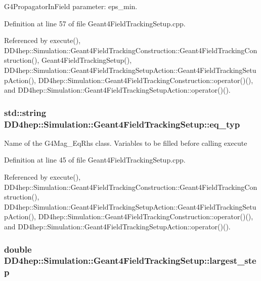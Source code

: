 G4PropagatorInField parameter: eps\_\-min. 

Definition at line 57 of file Geant4FieldTrackingSetup.cpp.

Referenced by execute(), DD4hep::Simulation::Geant4FieldTrackingConstruction::Geant4FieldTrackingConstruction(), Geant4FieldTrackingSetup(), DD4hep::Simulation::Geant4FieldTrackingSetupAction::Geant4FieldTrackingSetupAction(), DD4hep::Simulation::Geant4FieldTrackingConstruction::operator()(), and DD4hep::Simulation::Geant4FieldTrackingSetupAction::operator()().\hypertarget{struct_d_d4hep_1_1_simulation_1_1_geant4_field_tracking_setup_aade0e19505a1c090a549c923b079ca56}{
\subsubsection[{eq\_\-typ}]{\setlength{\rightskip}{0pt plus 5cm}std::string {\bf DD4hep::Simulation::Geant4FieldTrackingSetup::eq\_\-typ}}}
\label{struct_d_d4hep_1_1_simulation_1_1_geant4_field_tracking_setup_aade0e19505a1c090a549c923b079ca56}


Name of the G4Mag\_\-EqRhs class. Variables to be filled before calling execute 

Definition at line 45 of file Geant4FieldTrackingSetup.cpp.

Referenced by execute(), DD4hep::Simulation::Geant4FieldTrackingConstruction::Geant4FieldTrackingConstruction(), DD4hep::Simulation::Geant4FieldTrackingSetupAction::Geant4FieldTrackingSetupAction(), DD4hep::Simulation::Geant4FieldTrackingConstruction::operator()(), and DD4hep::Simulation::Geant4FieldTrackingSetupAction::operator()().\hypertarget{struct_d_d4hep_1_1_simulation_1_1_geant4_field_tracking_setup_a24ad8216cbc0b9c7991c9818a527fb76}{
\subsubsection[{largest\_\-step}]{\setlength{\rightskip}{0pt plus 5cm}double {\bf DD4hep::Simulation::Geant4FieldTrackingSetup::largest\_\-step}}}
\label{struct_d_d4hep_1_1_simulation_1_1_geant4_field_tracking_setup_a24ad8216cbc0b9c7991c9818a527fb76}


